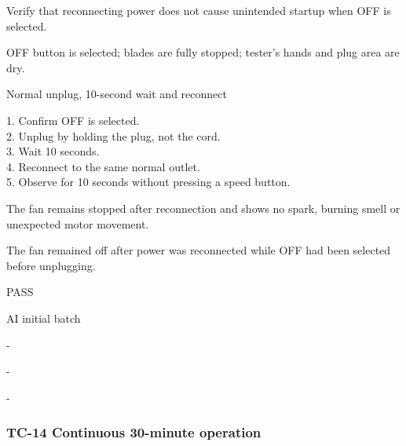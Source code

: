 \begin{description}[style=nextline,leftmargin=3.2cm]

\item[Objective] Verify that reconnecting power does not cause unintended startup when OFF is selected.

\item[Preconditions] OFF button is selected; blades are fully stopped; tester's hands and plug area are dry.

\item[Input] Normal unplug, 10-second wait and reconnect

\item[Steps] 1. Confirm OFF is selected.\\ 2. Unplug by holding the plug, not the cord.\\ 3. Wait 10 seconds.\\ 4. Reconnect to the same normal outlet.\\ 5. Observe for 10 seconds without pressing a speed button.

\item[Expected] The fan remains stopped after reconnection and shows no spark, burning smell or unexpected motor movement.

\item[Actual] The fan remained off after power was reconnected while OFF had been selected before unplugging.

\item[Verdict] PASS

\item[Source] AI initial batch

\item[Edge case] -

\item[Video] -

\item[Issue] -

\end{description}

\clearpage

\subsubsection{TC-14 Continuous 30-minute operation}

